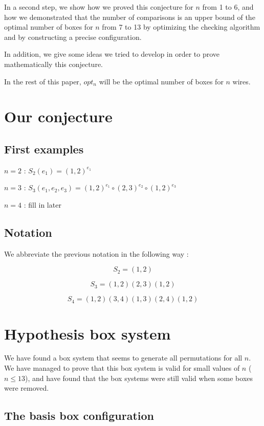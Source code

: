 \documentclass[11pt, a4paper]{article}
\begin{document}
In a second step, we show how we proved this conjecture for $n$ from 1 to 6, and
how we demonstrated that the number of comparisons is an upper bound of the
optimal number of boxes for $n$ from 7 to 13 by optimizing the checking
algorithm and by constructing a precise configuration.

In addition, we give some ideas we tried to develop in order to prove
mathematically this conjecture.

In the rest of this paper, $opt_n$ will be the optimal number of boxes for $n$
wires.



\section{Our conjecture}

\subsection{First examples}

$n=2$ : $S_2(e_1) = (1,2)^{e_1}$

$n=3$ : $S_3(e_1,e_2,e_3) = (1,2)^{e_1} \circ (2,3)^{e_2} \circ (1,2)^{e_3}$

$n=4$ : fill in later

\subsection {Notation}

We abbreviate the previous notation in the following way :

$$S_2 = (1,2)$$

$$S_3 = (1,2)(2,3)(1,2)$$

$$S_4 = (1,2)(3,4)(1,3)(2,4)(1,2)$$

\section{Hypothesis box system}

We have found a box system that seems to generate all permutations for all $n$.
We have managed to prove that this box system is valid for small values of $n$
($n \leq 13$), and have found that the box systems were still valid when some
boxes were removed.

\subsection{The basis box configuration}
\end{document}
